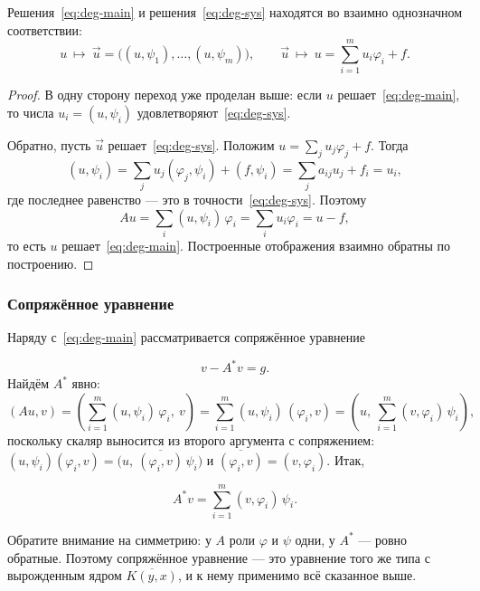 
\begin{proposition}\label{prop:deg-correspondence}
Решения~\eqref{eq:deg-main} и решения~\eqref{eq:deg-sys} находятся во взаимно
однозначном соответствии:
\[
  u \ \longmapsto\ \vec u = \big((u,\psi_1), \dots, (u,\psi_m)\big) ,
  \qquad
  \vec u \ \longmapsto\ u = \sum_{i=1}^{m} u_i \varphi_i + f .
\]
\end{proposition}

\begin{proof}
В одну сторону переход уже проделан выше: если $u$ решает~\eqref{eq:deg-main},
то числа $u_i = (u,\psi_i)$ удовлетворяют~\eqref{eq:deg-sys}.

\medskip
Обратно, пусть $\vec u$ решает~\eqref{eq:deg-sys}. Положим
$u = \sum_j u_j \varphi_j + f$. Тогда
\[
  (u, \psi_i) = \sum_{j} u_j (\varphi_j, \psi_i) + (f,\psi_i)
              = \sum_{j} a_{ij} u_j + f_i = u_i ,
\]
где последнее равенство — это в точности~\eqref{eq:deg-sys}. Поэтому
\[
  Au = \sum_{i} (u,\psi_i)\,\varphi_i = \sum_{i} u_i \varphi_i = u - f ,
\]
то есть $u$ решает~\eqref{eq:deg-main}. Построенные отображения взаимно
обратны по построению.
\end{proof}

\subsubsection*{Сопряжённое уравнение}

Наряду с~\eqref{eq:deg-main} рассматривается сопряжённое уравнение

\begin{equation}\tag{I$^*$}\label{eq:deg-adj}
  v - A^* v = g .
\end{equation}
Найдём $A^*$ явно:
\[
  (Au, v)
  = \left(\sum_{i=1}^{m} (u,\psi_i)\,\varphi_i,\ v\right)
  = \sum_{i=1}^{m} (u,\psi_i)\,(\varphi_i, v)
  = \left(u,\ \sum_{i=1}^{m} (v, \varphi_i)\,\psi_i \right) ,
\]
поскольку скаляр выносится из второго аргумента с сопряжением:
$(u,\psi_i)(\varphi_i,v) = \big(u,\ \overline{(\varphi_i,v)}\,\psi_i\big)$ и
$\overline{(\varphi_i,v)} = (v,\varphi_i)$. Итак,

\begin{equation}\tag{3}\label{eq:deg-Astar}
  A^* v = \sum_{i=1}^{m} (v, \varphi_i)\, \psi_i .
\end{equation}

\begin{idea}
Обратите внимание на симметрию: у $A$ роли $\varphi$ и $\psi$ одни, у $A^*$ —
ровно обратные. Поэтому сопряжённое уравнение — это уравнение того же типа с
вырожденным ядром $\overline{K(y,x)}$, и к нему применимо всё сказанное выше.
\end{idea}

